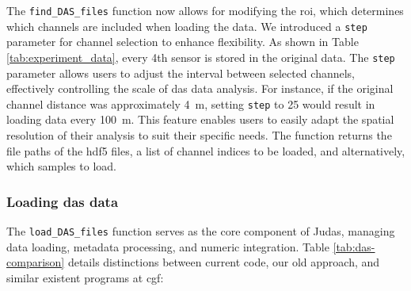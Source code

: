 The \texttt{find\_DAS\_files} function now allows for modifying the \acrfull{roi}, which determines which channels are included when loading the data. We introduced a \texttt{step} parameter for channel selection to enhance flexibility. As shown in Table \ref{tab:experiment_data}, every 4th sensor is stored in the original data. The \texttt{step} parameter allows users to adjust the interval between selected channels, effectively controlling the scale of \acrshort{das} data analysis. For instance, if the original channel distance was approximately \qty{4}{\meter}, setting \texttt{step} to 25 would result in loading data every \qty{100}{\meter}. This feature enables users to easily adapt the spatial resolution of their analysis to suit their specific needs.
The function returns the file paths of the \acrshort{hdf5} files, a list of channel indices to be loaded, and alternatively, which samples to load.

\subsubsection{Loading \acrshort{das} data}
The \texttt{load\_DAS\_files} function serves as the core component of Judas, managing data loading, metadata processing, and numeric integration. Table \ref{tab:das-comparison} details distinctions between current code, our old approach, and similar existent programs at \acrshort{cgf}:

